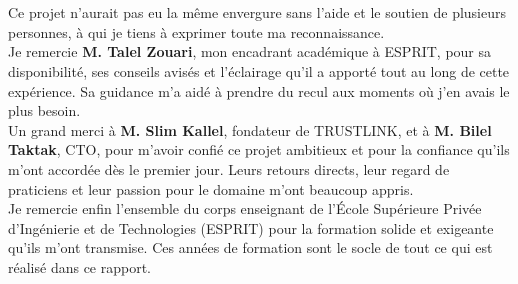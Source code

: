 \documentclass[../main.tex]{subfiles}
\begin{document}
\clearpage
\section*{}
\vspace{100pt}

Ce projet n'aurait pas eu la m\^{e}me envergure sans l'aide et le soutien de plusieurs personnes, \`{a} qui je tiens \`{a} exprimer toute ma reconnaissance.
\vspace{100pt}
\\
Je remercie \textbf{M. Talel Zouari}, mon encadrant acad\'{e}mique \`{a} ESPRIT, pour sa disponibilit\'{e}, ses conseils avis\'{e}s et l'\'{e}clairage qu'il a apport\'{e} tout au long de cette exp\'{e}rience. Sa guidance m'a aid\'{e} \`{a} prendre du recul aux moments o\`{u} j'en avais le plus besoin.
\vspace{30pt}
\\
Un grand merci \`{a} \textbf{M. Slim Kallel}, fondateur de TRUSTLINK, et \`{a} \textbf{M. Bilel Taktak}, CTO, pour m'avoir confi\'{e} ce projet ambitieux et pour la confiance qu'ils m'ont accord\'{e}e d\`{e}s le premier jour. Leurs retours directs, leur regard de praticiens et leur passion pour le domaine m'ont beaucoup appris.
\vspace{100pt}
\\
Je remercie enfin l'ensemble du corps enseignant de l'\'{E}cole Sup\'{e}rieure Priv\'{e}e d'Ing\'{e}nierie et de Technologies (ESPRIT) pour la formation solide et exigeante qu'ils m'ont transmise. Ces ann\'{e}es de formation sont le socle de tout ce qui est r\'{e}alis\'{e} dans ce rapport.

\clearpage
{}
\end{document}
